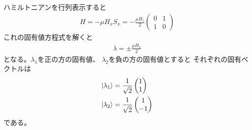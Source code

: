\documentclass[../../master.tex]{subfiles}
\begin{document}
\subsection{}
ハミルトニアンを行列表示すると
\begin{align}
    H = -\mu H_xS_x = -\frac{\mu H_z}{2}\begin{pmatrix}
        0 & 1\\
        1 & 0
    \end{pmatrix}
\end{align}
これの固有値方程式を解くと
\begin{align}
    \lambda = \pm \frac{\mu H_x}{2}
\end{align}
となる。\(\lambda_1\)を正の方の固有値、
\(\lambda_2\)を負の方の固有値とすると
それぞれの固有ベクトルは
\begin{align}
    \ket{\lambda_1} &= \frac{1}{\sqrt{2}}\begin{pmatrix}
        1 \\ 1
    \end{pmatrix}\\
    \ket{\lambda_2} &= \frac{1}{\sqrt{2}}\begin{pmatrix}
        1 \\ -1
    \end{pmatrix}
\end{align}
である。
\end{document}
